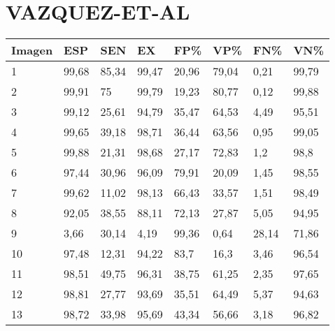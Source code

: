\section{VAZQUEZ-ET-AL}
\begin{longtable}[c]{|l|l|l|l|l|l|l|l|}
\hline
\textbf{Imagen} & \textbf{ESP} & \textbf{SEN} & \textbf{EX} & \textbf{FP\%} & \textbf{VP\%} & \textbf{FN\%} & \textbf{VN\%} \\ \hline
\endfirsthead
%
\endhead
%
1               & 99,68        & 85,34        & 99,47       & 20,96         & 79,04         & 0,21          & 99,79         \\ \hline
2               & 99,91        & 75           & 99,79       & 19,23         & 80,77         & 0,12          & 99,88         \\ \hline
3               & 99,12        & 25,61        & 94,79       & 35,47         & 64,53         & 4,49          & 95,51         \\ \hline
4               & 99,65        & 39,18        & 98,71       & 36,44         & 63,56         & 0,95          & 99,05         \\ \hline
5               & 99,88        & 21,31        & 98,68       & 27,17         & 72,83         & 1,2           & 98,8          \\ \hline
6               & 97,44        & 30,96        & 96,09       & 79,91         & 20,09         & 1,45          & 98,55         \\ \hline
7               & 99,62        & 11,02        & 98,13       & 66,43         & 33,57         & 1,51          & 98,49         \\ \hline
8               & 92,05        & 38,55        & 88,11       & 72,13         & 27,87         & 5,05          & 94,95         \\ \hline
9               & 3,66         & 30,14        & 4,19        & 99,36         & 0,64          & 28,14         & 71,86         \\ \hline
10              & 97,48        & 12,31        & 94,22       & 83,7          & 16,3          & 3,46          & 96,54         \\ \hline
11              & 98,51        & 49,75        & 96,31       & 38,75         & 61,25         & 2,35          & 97,65         \\ \hline
12              & 98,81        & 27,77        & 93,69       & 35,51         & 64,49         & 5,37          & 94,63         \\ \hline
13              & 98,72        & 33,98        & 95,69       & 43,34         & 56,66         & 3,18          & 96,82         \\ \hline

\end{longtable}
